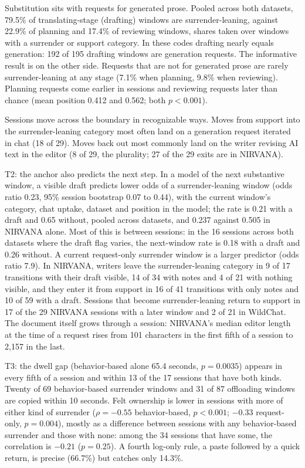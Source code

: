 \documentclass[manuscript,screen]{acmart}
\begin{document}
Substitution sits with requests for generated prose. Pooled across both datasets, 79.5\% of translating-stage (drafting) windows are surrender-leaning, against 22.9\% of planning and 17.4\% of reviewing windows, shares taken over windows with a surrender or support category. In these codes drafting nearly equals generation: 192 of 195 drafting windows are generation requests. The informative result is on the other side. Requests that are not for generated prose are rarely surrender-leaning at any stage (7.1\% when planning, 9.8\% when reviewing). Planning requests come earlier in sessions and reviewing requests later than chance (mean position 0.412 and 0.562; both $p < 0.001$).

Sessions move across the boundary in recognizable ways. Moves from support into the surrender-leaning category most often land on a generation request iterated in chat (18 of 29). Moves back out most commonly land on the writer revising AI text in the editor (8 of 29, the plurality; 27 of the 29 exits are in NIRVANA).

T2: the anchor also predicts the next step. In a model of the next substantive window, a visible draft predicts lower odds of a surrender-leaning window (odds ratio 0.23, 95\% session bootstrap 0.07 to 0.44), with the current window's category, chat uptake, dataset and position in the model; the rate is 0.21 with a draft and 0.65 without, pooled across datasets, and 0.237 against 0.505 in NIRVANA alone. Most of this is between sessions: in the 16 sessions across both datasets where the draft flag varies, the next-window rate is 0.18 with a draft and 0.26 without. A current request-only surrender window is a larger predictor (odds ratio 7.9). In NIRVANA, writers leave the surrender-leaning category in 9 of 17 transitions with their draft visible, 14 of 34 with notes and 4 of 21 with nothing visible, and they enter it from support in 16 of 41 transitions with only notes and 10 of 59 with a draft. Sessions that become surrender-leaning return to support in 17 of the 29 NIRVANA sessions with a later window and 2 of 21 in WildChat. The document itself grows through a session: NIRVANA's median editor length at the time of a request rises from 101 characters in the first fifth of a session to 2,157 in the last.

T3: the dwell gap (behavior-based alone 65.4 seconds, $p = 0.0035$) appears in every fifth of a session and within 13 of the 17 sessions that have both kinds. Twenty of 69 behavior-based surrender windows and 31 of 87 offloading windows are copied within 10 seconds. Felt ownership is lower in sessions with more of either kind of surrender ($\rho = -0.55$ behavior-based, $p < 0.001$; $-0.33$ request-only, $p = 0.004$), mostly as a difference between sessions with any behavior-based surrender and those with none: among the 34 sessions that have some, the correlation is $-0.21$ ($p = 0.25$). A fourth log-only rule, a paste followed by a quick return, is precise (66.7\%) but catches only 14.3\%.
\end{document}
